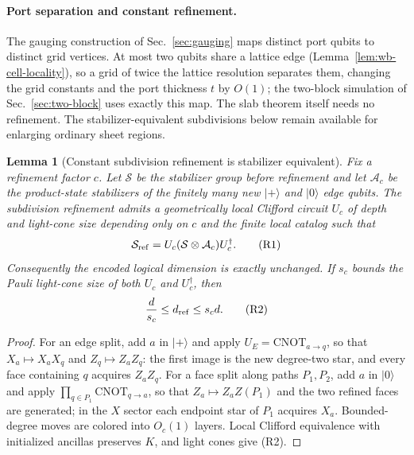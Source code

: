 \documentclass[aps,prx,reprint,superscriptaddress,nofootinbib,floatfix,longbibliography]{revtex4-2}
\newtheorem{lemma}[theorem]{Lemma}
\theoremstyle{definition}
\begin{document}
\paragraph{Port separation and constant refinement.}
The gauging construction of Sec.~\ref{sec:gauging} maps distinct port qubits
to distinct grid vertices.  At most two qubits share a lattice edge
(Lemma~\ref{lem:wb-cell-locality}), so a grid of twice the lattice resolution
separates them, changing the grid constants and the port thickness $t$ by
$O(1)$; the two-block simulation of Sec.~\ref{sec:two-block} uses exactly this
map.  The slab theorem itself needs no refinement.  The stabilizer-equivalent
subdivisions below remain available for enlarging ordinary sheet regions.

\begin{lemma}[Constant subdivision refinement is stabilizer equivalent]\label{lem:constant-refinement}
Fix a refinement factor $c$.  Let $\mathcal S$ be the stabilizer group before refinement and let $\mathcal A_c$ be the product-state stabilizers of the finitely many new $|+\rangle$ and $|0\rangle$ edge qubits.  The subdivision refinement admits a geometrically local Clifford circuit $U_c$ of depth and light-cone size depending only on $c$ and the finite local catalog such that
\begin{equation*}
 \mathcal S_{\rm ref}=U_c(\mathcal S\otimes\mathcal A_c)U_c^\dagger .\tag{R1}
\end{equation*}
Consequently the encoded logical dimension is exactly unchanged.  If $s_c$ bounds the Pauli light-cone size of both $U_c$ and $U_c^\dagger$, then
\begin{equation*}
 \frac{d}{s_c}\le d_{\rm ref}\le s_c d .\tag{R2}
\end{equation*}
\end{lemma}
\begin{proof}
For an edge split, add $a$ in $|+\rangle$ and apply $U_E=\mathrm{CNOT}_{a\to q}$, so that $X_a\mapsto X_aX_q$ and $Z_q\mapsto Z_aZ_q$: the first image is the new degree-two star, and every face containing $q$ acquires $Z_aZ_q$.  For a face split along paths $P_1,P_2$, add $a$ in $|0\rangle$ and apply $\prod_{q\in P_1}\mathrm{CNOT}_{q\to a}$, so that $Z_a\mapsto Z_aZ(P_1)$ and the two refined faces are generated; in the $X$ sector each endpoint star of $P_1$ acquires $X_a$.  Bounded-degree moves are colored into $O_c(1)$ layers.  Local Clifford equivalence with initialized ancillas preserves $K$, and light cones give (R2).
\end{proof}
\end{document}
